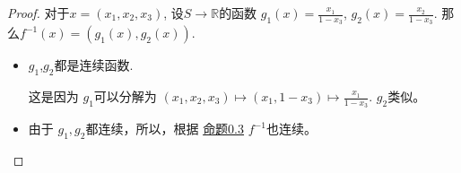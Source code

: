 \documentclass[font=windows]{ctexart}
\theoremstyle{definition}
\begin{document}
\begin{proof}
    对于\(x=(x_1,x_2,x_3)\), 设\(S\to \mathbb{R}\)的函数 \(g_1(x)=\frac{x_1}{1-x_3}\), \(g_2(x)=\frac{x_2}{1-x_3}\). 那么\(f^{-1}(x)=(g_1(x),g_2(x))\).
    \begin{itemize}
        \item \(g_1\),\(g_2\)都是连续函数.
        
        这是因为
            \(g_1\)可以分解为 \((x_1,x_2,x_3)\mapsto (x_1,1-x_3) \mapsto \frac{x_1}{1-x_3} \). \(g_2\)类似。
        \item  由于 \(g_1,g_2\)都连续，所以，根据 \hyperlink{03}{命题0.3} \(f^{-1}\)也连续。
    \end{itemize}
\end{proof}
\end{document}
